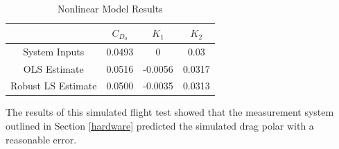 \begin{table}[ht]
\caption{Nonlinear Model Results} %
\centering %
\begin{tabular}{c c c c} %
\hline\hline %
 & $C_{D_0}$ & $K_1$ & $K_2$ \\ [0.5ex] %
\hline %
System Inputs & 0.0493 & 0 & 0.03 \\ %
OLS Estimate & 0.0516 & -0.0056 & 0.0317 \\
Robust LS Estimate & 0.0500 & -0.0035 & 0.0313 \\ [1ex] %
\hline %
\end{tabular}
\label{table:nonlin} %
\end{table}

The results of this simulated flight test showed that the measurement system outlined in Section \ref{hardware} predicted the simulated drag polar with a reasonable error.
